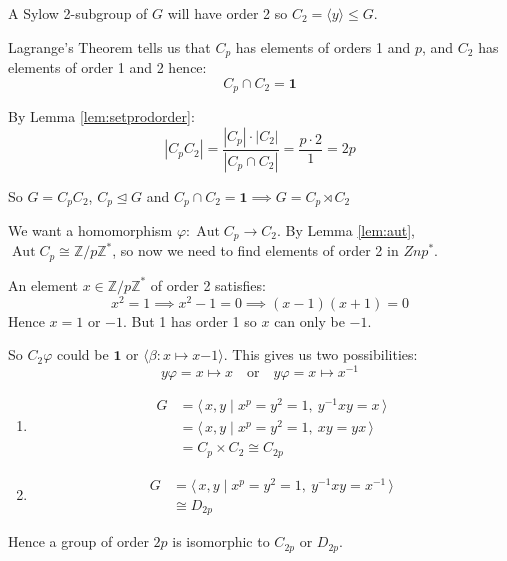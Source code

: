\documentclass[a4paper, oneside, 12pt, final]{article}
\theoremstyle{definition}
\DeclareMathOperator{\Aut}{Aut}
\newcommand{\Z}{\mathbb{Z}}
\newcommand{\Zn}[1]{\Z/#1\Z}
\begin{document}
A Sylow 2-subgroup of \(G\) will have order 2 so \(C_2 = \langle y \rangle
\leqslant G\).

Lagrange's Theorem tells us that \(C_p\) has elements of orders 1 and \(p\),
and \(C_2\) has elements of order 1 and 2 hence:
\[C_p \cap C_2 = \bm{1}\]

By Lemma \ref{lem:setprodorder}:
\[|C_p C_2| = \frac{|C_p| \cdot |C_2|}{|C_p \cap C_2|} = \frac{p \cdot 2}{1} =
2p\]

So \(G = C_p C_2\), \(C_p \unlhd G\) and \(C_p \cap C_2 = \bm{1} \implies G =
C_p \rtimes C_2\)

We want a homomorphism \(\varphi:\Aut{C_p} \to C_2\).
By Lemma \ref{lem:aut}, \(\Aut{C_p} \cong \Zn{p}^*\), so now we need to find elements of order 2 in \(Zn{p}^*\).

An element \(x \in \Zn{p}^*\) of order 2 satisfies:
\[x^2 = 1 \implies x^2 - 1 = 0 \implies (x-1)(x+1) = 0\]
Hence \(x = 1\) or \(-1\).
But 1 has order 1 so \(x\) can only be \(-1\).

So \(C_2\varphi\) could be \(\bm{1}\) or \(\langle \beta:x \mapsto x{-1}
\rangle\). This gives us two possibilities:
\[y\varphi = x \mapsto x \quad \text{or} \quad y\varphi = x \mapsto x^{-1}\]

\begin{enumerate}
    \item
        \begin{equation*}
        \begin{aligned}
            G &= \langle\, x, y \mid x^p = y^2 = 1,\ y^{-1}xy = x \,\rangle \\
            &=\langle\, x, y \mid x^p = y^2 = 1,\ xy = yx \,\rangle \\
            &= C_p \times C_2 \cong C_{2p}
        \end{aligned}
        \end{equation*}
    \item
        \begin{equation*}
        \begin{aligned}
            G &= \langle\, x, y \mid x^p = y^2 = 1,\ y^{-1}xy = x^{-1}
            \,\rangle \\
            &\cong D_{2p}
        \end{aligned}
        \end{equation*}
\end{enumerate}

Hence a group of order \(2p\) is isomorphic to \(C_{2p}\) or \(D_{2p}\).
\end{document}
